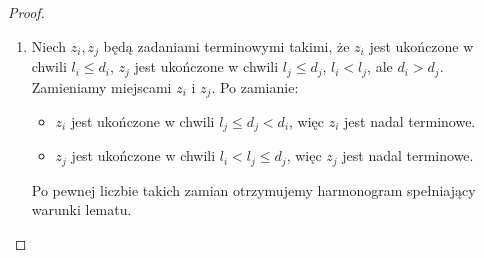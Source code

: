 \begin{proof}
\begin{enumerate}
		      \begin{figure}[H]
			      \centering
			      \caption*{Zadanie spóźnione $z_i$ (\textcolor{accentB}{pomarańczowe}) poprzedza zadanie terminowe $z_j$ (\textcolor{accent}{niebieskie}). Po zamianie $z_i$ kończy się jeszcze później (nadal spóźnione), a~$z_j$ wcześniej (nadal terminowe) --- suma kar bez zmian. Krok~2 to ten sam ruch między dwoma zadaniami terminowymi w~złej kolejności deadlinów.}
		      \end{figure}

		\item Niech $z_i, z_j$ będą zadaniami terminowymi takimi, że $z_i$ jest ukończone w chwili $l_i \leq d_i$, $z_j$ jest ukończone w chwili $l_j \leq d_j$, $l_i < l_j$, ale $d_i > d_j$.\\
		      Zamieniamy miejscami $z_i$ i $z_j$. Po zamianie:
		      \begin{itemize}[nosep]
			      \item $z_i$ jest ukończone w chwili $l_j \leq d_j < d_i$, więc $z_i$ jest nadal terminowe.
			      \item $z_j$ jest ukończone w chwili $l_i < l_j \leq d_j$, więc $z_j$ jest nadal terminowe.
		      \end{itemize}
		      Po pewnej liczbie takich zamian otrzymujemy harmonogram spełniający warunki lematu.
	\end{enumerate}
\end{proof}
